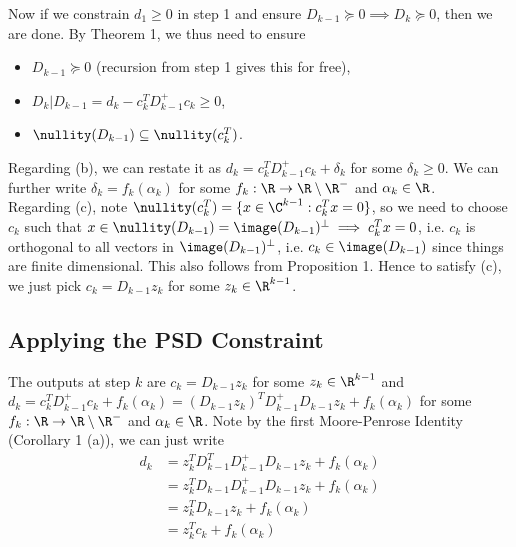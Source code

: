\documentclass[12pt]{article}
\begin{document}
    Now if we constrain $d_1 \geq 0$ in step 1 and ensure $D_{k-1} \succeq 0 \implies D_k \succeq 0$, then we are done. By Theorem 1, we thus need to ensure
    \begin{itemize}
        \item[(a)] $D_{k-1} \succeq 0$ (recursion from step 1 gives this for free),
        \item[(b)] $D_k | D_{k-1} = d_k - c_k^T D_{k-1}^+ c_k \geq 0$,
        \item[(c)] $\nullity(D_{k-1}) \subseteq \nullity(c_k^T)$.
    \end{itemize}

    Regarding (b), we can restate it as $d_k = c_k^T D_{k-1}^+ c_k + \delta_k$ for some $\delta_k \geq 0$. We can further write $\delta_k = f_k(\alpha_k)$ for some $f_k: \R \to \R \setminus \R^-$ and $\alpha_k \in \R$. \\[-6pt]

    Regarding (c), note $\nullity(c_k^T) = \{x \in \C^{k-1}: c_k^T x = 0\}$, so we need to choose $c_k$ such that $x \in \nullity(D_{k-1}) = \image(D_{k-1})^\perp \implies c_k^T x = 0$, i.e. $c_k$ is orthogonal to all vectors in $\image(D_{k-1})^\perp$, i.e. $c_k \in \image(D_{k-1})$ since things are finite dimensional. This also follows from Proposition 1. Hence to satisfy (c), we just pick $c_k = D_{k-1}z_k$ for some $z_k \in \R^{k-1}$.

    \subsection{Applying the PSD Constraint}

    The outputs at step $k$ are $c_k = D_{k-1}z_k$ for some $z_k \in \R^{k-1}$ and $d_k = c_k^T D_{k-1}^+ c_k + f_k(\alpha_k) = (D_{k-1} z_k)^T D_{k-1}^+ D_{k-1} z_k + f_k(\alpha_k)$ for some $f_k: \R \to \R \setminus \R^-$ and $\alpha_k \in \R$. Note by the first Moore-Penrose Identity (Corollary 1 (a)), we can just write
    \begin{align*}
        d_k &= z_k^T D_{k-1}^TD_{k-1}^+ D_{k-1} z_k + f_k(\alpha_k) \\
        &= z_k^T D_{k-1}D_{k-1}^+ D_{k-1} z_k + f_k(\alpha_k) \\
        &= z_k^T D_{k-1} z_k + f_k(\alpha_k) \\
        &= z_k^T c_k + f_k(\alpha_k)
    \end{align*}
\end{document}
